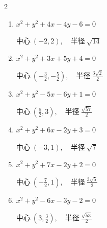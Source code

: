 \begin{multicols}{2}
\begin{enumerate}
  \item $x^{2}+y^{2}+4x-4y-6=0$

        $\displaystyle 中心\: \left(-2,2\right), \quad 半径 \ \sqrt{14}$

  \item $x^{2}+y^{2}+3x+5y+4=0$

        $\displaystyle 中心\: \left(-\frac{3}{2},-\frac{5}{2}\right), \quad 半径 \ \frac{3\sqrt{2}}{2}$

  \item $x^{2}+y^{2}-5x-6y+1=0$

        $\displaystyle 中心\: \left(\frac{5}{2},3\right), \quad 半径 \ \frac{\sqrt{57}}{2}$

  \item $x^{2}+y^{2}+6x-2y+3=0$

        $\displaystyle 中心\: \left(-3,1\right), \quad 半径 \ \sqrt{7}$

  \item $x^{2}+y^{2}+7x-2y+2=0$

        $\displaystyle 中心\: \left(-\frac{7}{2},1\right), \quad 半径 \ \frac{3\sqrt{5}}{2}$

  \item $x^{2}+y^{2}-6x-3y-2=0$

        $\displaystyle 中心\: \left(3,\frac{3}{2}\right), \quad 半径 \ \frac{\sqrt{53}}{2}$

\end{enumerate}
\end{multicols}
